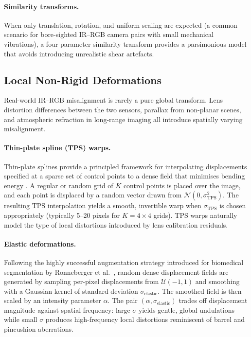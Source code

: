 \paragraph{Similarity transforms.}
When only translation, rotation, and uniform scaling are expected (a common
scenario for bore-sighted IR--RGB camera pairs with small mechanical
vibrations), a four-parameter similarity transform provides a parsimonious
model that avoids introducing unrealistic shear artefacts.

\subsection{Local Non-Rigid Deformations}
\label{subsec:local_deformations}

Real-world IR--RGB misalignment is rarely a pure global transform.  Lens
distortion differences between the two sensors, parallax from non-planar
scenes, and atmospheric refraction in long-range imaging all introduce
spatially varying misalignment.

\paragraph{Thin-plate spline (TPS) warps.}
Thin-plate splines provide a principled framework for interpolating
displacements specified at a sparse set of control points to a dense field
that minimises bending energy \cite{bookstein1989principal}.  A regular or
random grid of $K$ control points is placed over the image, and each point is
displaced by a random vector drawn from $\mathcal{N}(0, \sigma_{\mathrm{TPS}}^{2})$.
The resulting TPS interpolation yields a smooth, invertible warp when
$\sigma_{\mathrm{TPS}}$ is chosen appropriately (typically 5--20 pixels for
$K = 4\times4$ grids).  TPS warps naturally model the type of local
distortions introduced by lens calibration residuals.

\paragraph{Elastic deformations.}
Following the highly successful augmentation strategy introduced for
biomedical segmentation by Ronneberger et al.\ \cite{ronneberger2015unet},
random dense displacement fields are generated by sampling per-pixel
displacements from $\mathcal{U}(-1,1)$ and smoothing with a Gaussian kernel
of standard deviation $\sigma_{\mathrm{elastic}}$.  The smoothed field is then
scaled by an intensity parameter $\alpha$.  The pair
$(\alpha, \sigma_{\mathrm{elastic}})$ trades off displacement magnitude against
spatial frequency: large $\sigma$ yields gentle, global undulations while
small $\sigma$ produces high-frequency local distortions reminiscent of barrel
and pincushion aberrations.


